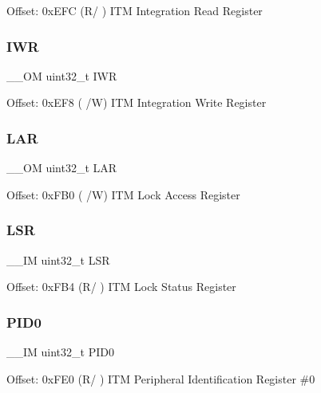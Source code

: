 Offset\+: 0x\+E\+FC (R/ ) I\+TM Integration Read Register \mbox{\label{struct_i_t_m___type_a68e56eb5e16d2aa293b0bec5c99e50fe}} 
\subsubsection{\texorpdfstring{IWR}{IWR}}
{\footnotesize\ttfamily \+\_\+\+\_\+\+OM uint32\+\_\+t I\+WR}

Offset\+: 0x\+E\+F8 ( /W) I\+TM Integration Write Register \mbox{\label{struct_i_t_m___type_acc9e51f871c357a9094105435b150d13}} 
\subsubsection{\texorpdfstring{LAR}{LAR}}
{\footnotesize\ttfamily \+\_\+\+\_\+\+OM uint32\+\_\+t L\+AR}

Offset\+: 0x\+F\+B0 ( /W) I\+TM Lock Access Register \mbox{\label{struct_i_t_m___type_a7219432d03f6cd1d220f4fe10aef4880}} 
\subsubsection{\texorpdfstring{LSR}{LSR}}
{\footnotesize\ttfamily \+\_\+\+\_\+\+IM uint32\+\_\+t L\+SR}

Offset\+: 0x\+F\+B4 (R/ ) I\+TM Lock Status Register \mbox{\label{struct_i_t_m___type_a6e3343cc3c4a8a5a6f14937882e9202a}} 
\subsubsection{\texorpdfstring{PID0}{PID0}}
{\footnotesize\ttfamily \+\_\+\+\_\+\+IM uint32\+\_\+t P\+I\+D0}

Offset\+: 0x\+F\+E0 (R/ ) I\+TM Peripheral Identification Register \#0 \mbox{\label{struct_i_t_m___type_afa06959344f4991b00e6c545dd2fa30b}} 

